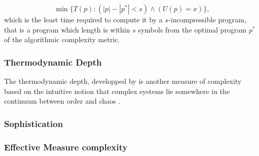 \begin{equation}
  \label{eq:2}
  \min\{T(p): (|p| - |p^{*}| < s ) \wedge (U(p) = x) \},
\end{equation}
which is the least time required to compute it by a $s$-incompressible program,
that is a program which length is within $s$ symbols from the optimal program
$p^{*}$ of the algorithmic complexity metric.
\textcite{gutowitzCellularAutomataSciences1995}

\subsubsection{Thermodynamic Depth}

The thermodynamic depth, developped by
\textcite{lloydComplexityThermodynamicDepth1988} is another measure of
complexity based on the intuitive notion that complex systems lie somewhere in
the continuum between order and chaos
\parencite{chaitinInformationRandomnessIncompleteness1990,
  ceccattoComplexityHierarchicalSystems1988, deutschQuantumTheoryChurch1985}.

\subsubsection{Sophistication}

\parencite{koppelAlmostMachineindependentTheory1991a}

\subsubsection{Effective Measure complexity}

\parencite{grassbergerQuantitativeTheorySelfgenerated1986}
